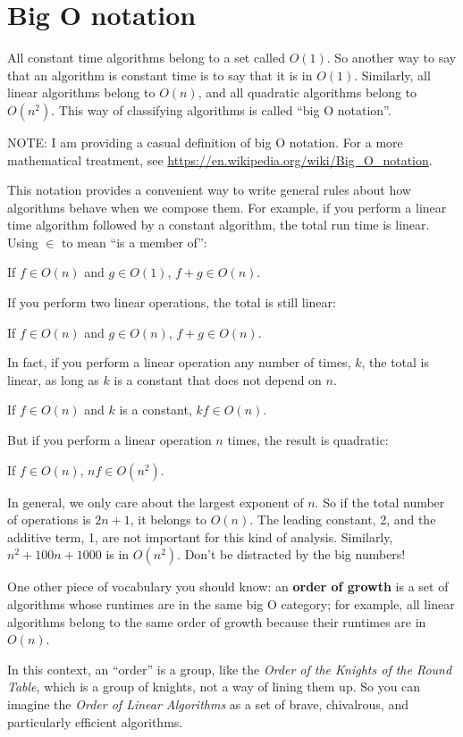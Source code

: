 \documentclass[12pt]{book}
\theoremstyle{exercise}
\begin{document}
\section{Big O notation}
\label{big-o-notation}

All constant time algorithms belong to a set called $O(1)$. So another way
to say that an algorithm is constant time is to say that it is in $O(1)$.
Similarly, all linear algorithms belong to $O(n)$, and all quadratic
algorithms belong to $O(n^2)$. This way of classifying algorithms is called
``big O notation''.

NOTE: I am providing a casual definition of big O notation. For a more
mathematical treatment, see
\url{https://en.wikipedia.org/wiki/Big_O_notation}.

This notation provides a convenient way to write general rules about how
algorithms behave when we compose them. For example, if you perform a
linear time algorithm followed by a constant algorithm, the total run
time is linear. Using $\in$ to mean ``is a member of'':

If $f \in O(n)$ and $g \in O(1)$, $f+g \in O(n)$.

If you perform two linear operations, the total is still linear:

If $f \in O(n)$ and $g \in O(n)$, $f+g \in O(n)$.

In fact, if you perform a linear operation any number of times,
$k$, the total is linear, as long as $k$ is a constant
that does not depend on $n$.

If $f \in O(n)$ and $k$ is a constant, $kf \in O(n)$.

But if you perform a linear operation $n$ times, the result is
quadratic:

If $f \in O(n)$, $nf \in O(n^2)$.

In general, we only care about the largest exponent of $n$. So if
the total number of operations is $2n + 1$, it belongs to
$O(n)$. The leading constant, 2, and the additive term, 1, are
not important for this kind of analysis. Similarly, $n^2 + 100n + 1000$ is
in $O(n^2)$.  Don't be distracted by the big numbers!

One other piece of vocabulary you should know: an {\bf order of
  growth} is a set of algorithms whose runtimes are in the same big O
category; for example, all linear algorithms belong to the same order
of growth because their runtimes are in $O(n)$.

In this context, an ``order'' is a group, like the \emph{Order of
the Knights of the Round Table}, which is a group of knights, not a way
of lining them up. So you can imagine the \emph{Order of Linear
Algorithms} as a set of brave, chivalrous, and particularly efficient
algorithms.
\end{document}
